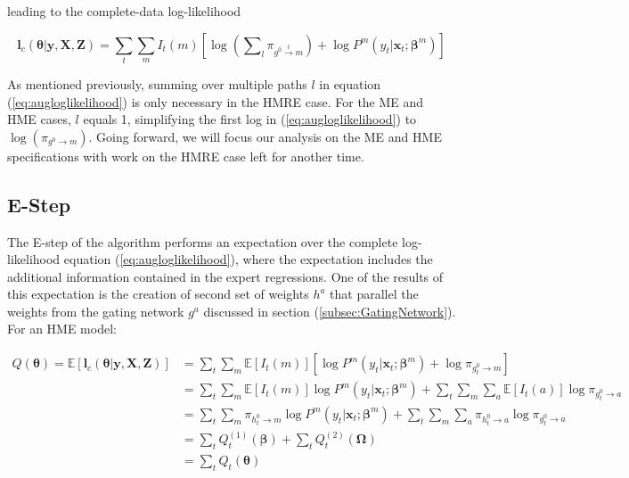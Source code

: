 \documentclass[12pt]{article}
\newcommand{\EIm}[1]{\mathbb{E} \left[ I_{t}(#1) \right]}
\newcommand{\gateprod}[2]{\pi_{#1 \longrightarrow #2}}
\newcommand{\sumgateprod}[3]{\pi_{#1 \overset{#3}{\longrightarrow} #2}}
\newcommand{\shortsum}[1]{\sum \nolimits_{#1}}
\begin{document}
leading to the complete-data log-likelihood

\begin{equation}  \label{eq:augloglikelihood}
  \boldsymbol{l}_{c}(\boldsymbol{\theta}| \boldsymbol{y}, \boldsymbol{X}, \boldsymbol{Z}) = \sum_{t} \sum_{m} I_{t}(m) \left[\log \left( \shortsum{l} \sumgateprod{g^{0}}{m}{l} \right) + \log P^{m}(y_{t}| \boldsymbol{x}_{t}; \boldsymbol{\beta}^{m}) \right]
\end{equation}

As mentioned previously, summing over multiple paths $l$ in equation
(\ref{eq:augloglikelihood}) is only necessary in the HMRE case. For the ME
and HME cases, $l$ equals 1, simplifying the first log in (\ref{eq:augloglikelihood})
to $\log(\gateprod{g^{0}}{m})$. Going forward, we will focus our analysis on
the ME and HME specifications with work on the HMRE case left for another time.

\subsection{E-Step} \label{sec:Estep}
The E-step of the algorithm performs an expectation over the complete
log-likelihood equation (\ref{eq:augloglikelihood}), where the expectation
includes the additional information contained in the expert regressions.
One of the results of this expectation is the creation of second set of
weights $h^{a}$ that parallel the weights from the gating network $g^{a}$
discussed in section (\ref{subsec:GatingNetwork}). For an HME model:

\begin{equation} \label{eq:Estep}
  \begin{split}
  Q(\boldsymbol{\theta}) = \mathbb{E} \left [ \boldsymbol{l}_{c}(\boldsymbol{\theta}| \boldsymbol{y}, \boldsymbol{X}, \boldsymbol{Z}) \right] & = \sum_{t}\sum_{m} \EIm{m} \left[ \log P^{m}(y_{t}| \boldsymbol{x}_{t}; \boldsymbol{\beta}^{m}) + \log \gateprod{g^{0}_{t}}{m} \right] \\ 
   & = \sum_{t} \sum_{m} \EIm{m}  \log P^{m}(y_{t}| \boldsymbol{x}_{t}; \boldsymbol{\beta}^{m})   +       \sum_{t} \sum_{m} \sum_{a} \mathbb{E} \left[ I_{t}(a) \right] \log \gateprod{g^{0}_{t}}{a} \\
   & = \sum_{t} \sum_{m} \gateprod{h^{0}_{t}}{m}  \log P^{m}(y_{t}| \boldsymbol{x}_{t}; \boldsymbol{\beta}^{m})   +       \sum_{t} \sum_{m} \sum_{a} \gateprod{h^{0}_{t}}{a} \log \gateprod{g^{0}_{t}}{a} \\
   & = \sum_{t} Q^{(1)}_{t} (\boldsymbol{\beta}) + \sum_{t} Q^{(2)}_{t} (\boldsymbol{\Omega}) \\
   & = \sum_{t} Q_{t}(\boldsymbol{\theta})
 \end{split}
\end{equation}
\end{document}
